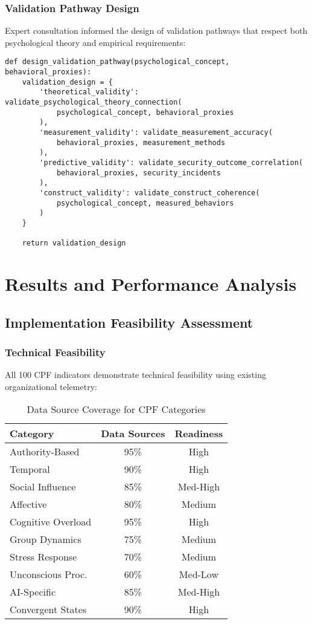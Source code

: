 \documentclass[11pt, onecolumn]{article}
\begin{document}
\subsubsection{Validation Pathway Design}

Expert consultation informed the design of validation pathways that respect both psychological theory and empirical requirements:

\begin{lstlisting}
def design_validation_pathway(psychological_concept, behavioral_proxies):
    validation_design = {
        'theoretical_validity': validate_psychological_theory_connection(
            psychological_concept, behavioral_proxies
        ),
        'measurement_validity': validate_measurement_accuracy(
            behavioral_proxies, measurement_methods
        ),
        'predictive_validity': validate_security_outcome_correlation(
            behavioral_proxies, security_incidents
        ),
        'construct_validity': validate_construct_coherence(
            psychological_concept, measured_behaviors
        )
    }
    
    return validation_design
\end{lstlisting}

\section{Results and Performance Analysis}

\subsection{Implementation Feasibility Assessment}

\subsubsection{Technical Feasibility}

All 100 CPF indicators demonstrate technical feasibility using existing organizational telemetry:

\begin{table}[h!]
\centering
\caption{Data Source Coverage for CPF Categories}
\begin{tabular}{lcc}
\toprule
Category & Data Sources & Readiness \\
\midrule
Authority-Based & 95\% & High \\
Temporal & 90\% & High \\
Social Influence & 85\% & Med-High \\
Affective & 80\% & Medium \\
Cognitive Overload & 95\% & High \\
Group Dynamics & 75\% & Medium \\
Stress Response & 70\% & Medium \\
Unconscious Proc. & 60\% & Med-Low \\
AI-Specific & 85\% & Med-High \\
Convergent States & 90\% & High \\
\bottomrule
\end{tabular}
\end{table}
\end{document}
